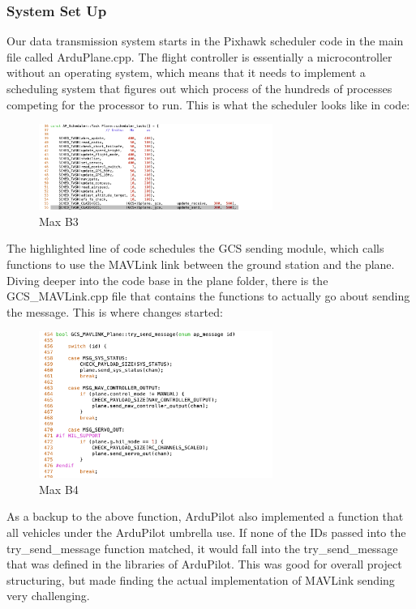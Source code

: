 \documentclass[12pt,journal,compsoc]{IEEEtran}
\begin{document}
\subsubsection{System Set Up}
Our data transmission system starts in the Pixhawk scheduler code in the main file called ArduPlane.cpp. The flight controller is essentially a microcontroller without an operating system, which means that it needs to implement a scheduling system that figures out which process of the hundreds of processes competing for the processor to run. This is what the scheduler looks like in code:
\begin{figure}[h!]
\hspace*{0cm}
\centering
\includegraphics[width=3in]{Scheduler.png}
\caption{Max B3}
\label{mavSched}
\end{figure}

The highlighted line of code schedules the GCS sending module, which calls functions to use the MAVLink link between the ground station and the plane. Diving deeper into the code base in the plane folder, there is the GCS\_MAVLink.cpp file that contains the functions to actually go about sending the message. This is where changes started:
\begin{figure}[h!]
\hspace*{0cm}
\centering
\includegraphics[width=3in]{GCS_Mavlink.png}
\caption{Max B4}
\label{gcsMav}
\end{figure}

As a backup to the above function, ArduPilot also implemented a function that all vehicles under the ArduPilot umbrella use. If none of the IDs passed into the try\_send\_message function matched, it would fall into the try\_send\_message that was defined in the libraries of ArduPilot.  This was good for overall project structuring, but made finding the actual implementation of MAVLink sending very challenging. 
\end{document}
